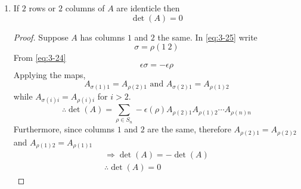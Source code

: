 \documentclass{article}
\numberwithin{equation}{section}
\begin{document}
\begin{enumerate}
        \item If $2$ rows or $2$ columns of $A$ are identicle then
        \begin{equation}\label{eq:3-29}
            \det (A) = 0
        \end{equation}
        \begin{proof}
            Suppose $A$ has columns $1$ and $2$ the same. In \eqref{eq:3-25} write
            \[
                \sigma = \rho(1\ 2)  
            \]
            From \eqref{eq:3-24}
            \[
                \epsilon{\sigma} = -\epsilon{\rho}  
            \]
            Applying the maps,
            \[
                A_{\sigma(1)1} = A_{\rho(2)1} \text{ and } A_{\sigma(2)1} = A_{\rho(1)2}
            \]
            while $A_{\sigma(i)i} = A_{\rho(i)i}$ for $i > 2$.
            \[
                \therefore \det(A) = \sum_{\rho \in S_n} - \epsilon(\rho) A_{\rho(2)1}A_{\rho(1)2} \cdots A_{\rho(n)n}
            \]
            Furthermore, since columns $1$ and $2$ are the same, therefore $A_{\rho(2)1} = A_{\rho(2)2}$ and $A_{\rho(1)2} = A_{\rho(1)1}$
            \begin{align*}
                \Rightarrow \det(A) = - \det(A) \\
                \therefore \det(A) = 0
            \end{align*}
        \end{proof}


\end{enumerate}
\end{document}
